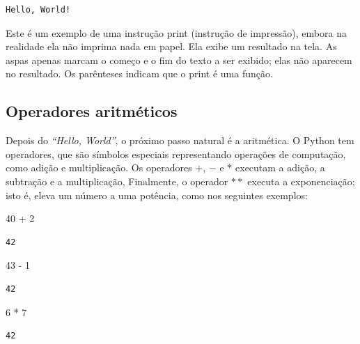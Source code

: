 \documentclass[
  brazilian,
  letterpaper,
  DIV=11,
  numbers=noendperiod]{scrreprt}
\newenvironment{Shaded}{\begin{snugshade}}{\end{snugshade}}
\newcommand{\DecValTok}[1]{\textcolor[rgb]{0.68,0.00,0.00}{#1}}
\newcommand{\OperatorTok}[1]{\textcolor[rgb]{0.37,0.37,0.37}{#1}}
\begin{document}
\begin{verbatim}
Hello, World!
\end{verbatim}

Este é um exemplo de uma instrução print (instrução de impressão),
embora na realidade ela não imprima nada em papel. Ela exibe um
resultado na tela. As aspas apenas marcam o começo e o fim do texto a
ser exibido; elas não aparecem no resultado. Os parênteses indicam que o
print é uma função.

\subsection{Operadores aritméticos}\label{operadores-aritmuxe9ticos}

Depois do \emph{``Hello, World''}, o próximo passo natural é a
aritmética. O Python tem operadores, que são símbolos especiais
representando operações de computação, como adição e multiplicação. Os
operadores \(+\), \(-\) e \(*\) executam a adição, a subtração e a
multiplicação, Finalmente, o operador \(**\) executa a exponenciação;
isto é, eleva um número a uma potência, como nos seguintes exemplos:

\begin{Shaded}
\begin{Highlighting}[]
\DecValTok{40} \OperatorTok{+} \DecValTok{2}
\end{Highlighting}
\end{Shaded}

\begin{verbatim}
42
\end{verbatim}

\begin{Shaded}
\begin{Highlighting}[]
\DecValTok{43} \OperatorTok{{-}} \DecValTok{1}
\end{Highlighting}
\end{Shaded}

\begin{verbatim}
42
\end{verbatim}

\begin{Shaded}
\begin{Highlighting}[]
\DecValTok{6} \OperatorTok{*} \DecValTok{7}
\end{Highlighting}
\end{Shaded}

\begin{verbatim}
42
\end{verbatim}
\end{document}
